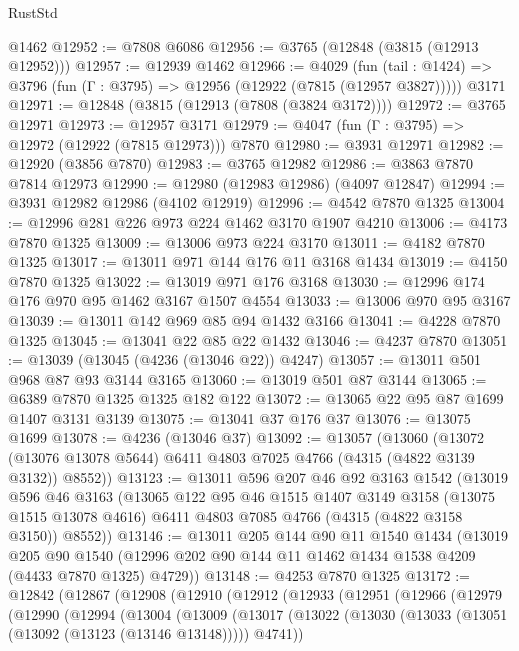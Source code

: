 \begin{lexlean}{RustStd}
\begin{coremodule}
    @1462
@12952 := @7808 @6086
@12956 := @3765 (@12848 (@3815 (@12913 @12952)))
@12957 := @12939 @1462
@12966 := @4029
    (fun (tail : @1424) => @3796 (fun (Γ : @3795) => @12956 (@12922 (@7815 (@12957 @3827)))))
    @3171
@12971 := @12848 (@3815 (@12913 (@7808 (@3824 @3172))))
@12972 := @3765 @12971
@12973 := @12957 @3171
@12979 := @4047 (fun (Γ : @3795) => @12972 (@12922 (@7815 @12973))) @7870
@12980 := @3931 @12971
@12982 := @12920 (@3856 @7870)
@12983 := @3765 @12982
@12986 := @3863 @7870 @7814 @12973
@12990 := @12980 (@12983 @12986) (@4097 @12847)
@12994 := @3931 @12982 @12986 (@4102 @12919)
@12996 := @4542 @7870 @1325
@13004 := @12996 @281 @226 @973 @224 @1462 @3170 @1907 @4210
@13006 := @4173 @7870 @1325
@13009 := @13006 @973 @224 @3170
@13011 := @4182 @7870 @1325
@13017 := @13011 @971 @144 @176 @11 @3168 @1434
@13019 := @4150 @7870 @1325
@13022 := @13019 @971 @176 @3168
@13030 := @12996 @174 @176 @970 @95 @1462 @3167 @1507 @4554
@13033 := @13006 @970 @95 @3167
@13039 := @13011 @142 @969 @85 @94 @1432 @3166
@13041 := @4228 @7870 @1325
@13045 := @13041 @22 @85 @22 @1432
@13046 := @4237 @7870
@13051 := @13039 (@13045 (@4236 (@13046 @22)) @4247)
@13057 := @13011 @501 @968 @87 @93 @3144 @3165
@13060 := @13019 @501 @87 @3144
@13065 := @6389 @7870 @1325 @1325 @182 @122
@13072 := @13065 @22 @95 @87 @1699 @1407 @3131 @3139
@13075 := @13041 @37 @176 @37
@13076 := @13075 @1699
@13078 := @4236 (@13046 @37)
@13092 := @13057
    (@13060
      (@13072 (@13076 @13078 @5644) @6411 @4803 @7025 @4766 (@4315 (@4822 @3139 @3132)) @8552))
@13123 := @13011
    @596
    @207
    @46
    @92
    @3163
    @1542
    (@13019
      @596
      @46
      @3163
      (@13065
        @122
        @95
        @46
        @1515
        @1407
        @3149
        @3158
        (@13075 @1515 @13078 @4616)
        @6411
        @4803
        @7085
        @4766
        (@4315 (@4822 @3158 @3150))
        @8552))
@13146 := @13011
    @205
    @144
    @90
    @11
    @1540
    @1434
    (@13019
      @205
      @90
      @1540
      (@12996 @202 @90 @144 @11 @1462 @1434 @1538 @4209 (@4433 @7870 @1325) @4729))
@13148 := @4253 @7870 @1325
@13172 := @12842
    (@12867
      (@12908
        (@12910
          (@12912
            (@12933
              (@12951
                (@12966
                  (@12979
                    (@12990
                      (@12994
                        (@13004
                          (@13009
                            (@13017
                              (@13022
                                (@13030 (@13033 (@13051 (@13092 (@13123 (@13146 @13148))))) @4741))

\end{coremodule}
\end{lexlean}
